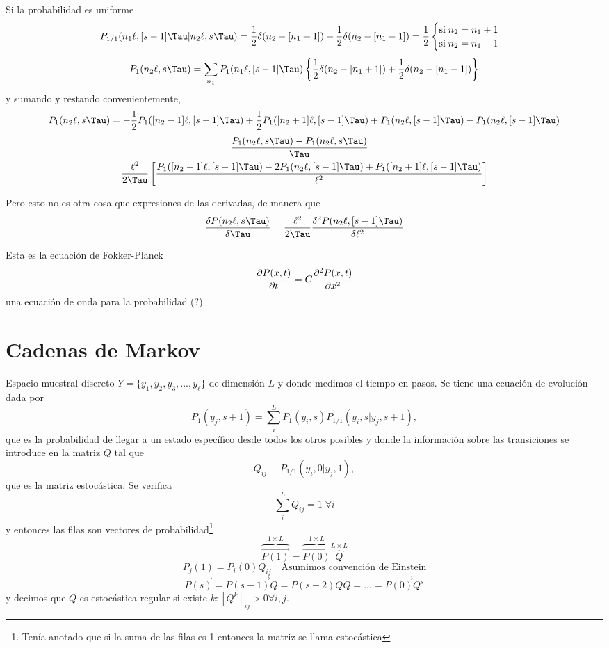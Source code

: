 \documentclass[10pt,oneside]{CBFT_book}
\begin{document}
Si la probabilidad es uniforme 
\[
	P_{1/1}(n_1\ell,[s-1]\Tau|n_2\ell,s\Tau) =
	\frac{1}{2}\delta(n_2-[n_1+1]) + \frac{1}{2}\delta(n_2-[n_1-1]) = \frac{1}{2}
	\begin{cases}
	 \text{si} \; n_2 = n_1 + 1 \\
	 \text{si} \; n_2 = n_1 - 1
	\end{cases}
\]
\[
	P_1(n_2\ell,s\Tau) = \sum_{n_1} P_1(n_1\ell,[s-1]\Tau)\left\{
	\frac{1}{2}\delta(n_2-[n_1+1]) + \frac{1}{2}\delta(n_2-[n_1-1])
	\right\}
\]
y sumando y restando convenientemente,
\[
	P_1(n_2\ell,s\Tau) = -\frac{1}{2}P_1([n_2-1]\ell,[s-1]\Tau) + 
\frac{1}{2}P_1([n_2+1]\ell,[s-1]\Tau)
	+ P_1(n_2\ell,[s-1]\Tau) - P_1(n_2\ell,[s-1]\Tau)
\]
\begin{multline}
	\frac{P_1(n_2\ell,s\Tau) - P_1(n_2\ell,s\Tau)}{\Tau} = \\
	\frac{\ell^2}{2\Tau} \left[ \frac{ P_1([n_2-1]\ell,[s-1]\Tau) - 
2P_1(n_2\ell,[s-1]\Tau) + P_1([n_2+1]\ell,[s-1]\Tau) }{\ell^2} \right] 
\end{multline}


Pero esto no es otra cosa que expresiones de las derivadas, de manera que
\[
	\frac{\delta P(n_2\ell,s\Tau)}{\delta \Tau} =
	\frac{\ell^2}{2\Tau} \frac{\delta^2 P(n_2\ell,[s-1]\Tau)}{\delta\ell^2}
\]

Esta es la ecuación de Fokker-Planck
\[
	\dpar{P(x,t)}{t} = C \dpar[2]{P(x,t)}{x}
\]
una ecuación de onda para la probabilidad (?)


\section{Cadenas de Markov}

Espacio muestral discreto $Y=\{ y_1, y_2, y_3,...,y_\ell \}$ de dimensión $L$ y donde
medimos el tiempo en pasos.
Se tiene una ecuación de evolución dada por
\[
	P_1(y_j,s+1) = \sum_i^L P_1(y_i,s) P_{1/1}(y_i,s|y_j,s+1),
\]
que es la probabilidad de llegar a un estado específico desde todos los otros posibles y
donde la información sobre las transiciones se introduce en la matriz $Q$ tal que 
\[
	Q_{ij} \equiv P_{1/1}(y_i,0|y_j,1),
\]
que es la matriz estocástica.
Se verifica
\[
	\sum_i^L Q_{ij} = 1 \; \forall i
\]
y entonces las filas son vectores de probabilidad\footnote{Tenía anotado que si
la suma de las filas es 1 entonces la matriz se llama estocástica}
\[
	\overbrace{\vec{P(1)}}^{1\times L} =  \overbrace{\vec{P(0)}}^{1\times L} 
\overbrace{Q}^{L\times L}
\]
\[
	P_j(1) = P_i(0) Q_{ij} \quad \text{Asumimos convención de Einstein}
\]
\[
	\vec{P(s)} = \vec{P(s-1)}Q = \vec{P(s-2)} Q Q = ... = \vec{P(0)}Q^s
\] 
y decimos que $Q$ es estocástica regular si existe $k : [Q^k]_{ij} > 0 \forall i,j$.
\end{document}
